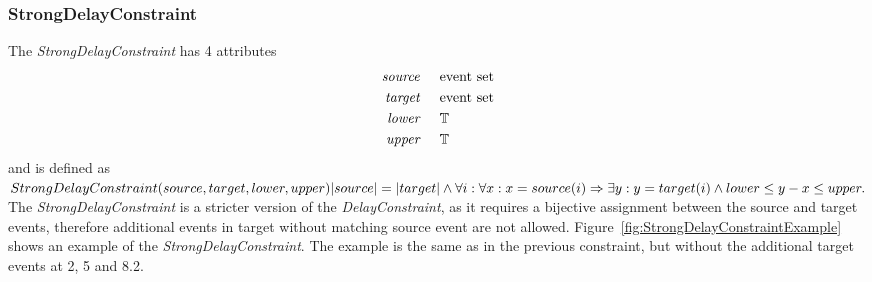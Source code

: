 	\subsubsection{StrongDelayConstraint}
		The \emph{StrongDelayConstraint} has 4 attributes
		\begin{align*}
			\emph{source} & \hspace{.5cm}\text{event set}\\
			\emph{target} & \hspace{.5cm}\text{event set}\\
			\emph{lower}  & \hspace{.5cm}\text{$\mathbb{T}$}\\
			\emph{upper}  & \hspace{.5cm}\text{$\mathbb{T}$}
		\end{align*}
		and is defined as\\[10pt]
		\begin{math}
			StrongDelayConstraint( source, target, lower, upper )\\
			|source| = |target| \land\\
			\forall i: \forall x: x=source(i) \Rightarrow \exists y: y=target(i)\land lower\leq y-x\leq upper.
		\end{math}\\[10pt]
		The \emph{StrongDelayConstraint} is a stricter version of the \emph{DelayConstraint}, as it requires a bijective assignment between the source and target events, therefore additional events in target without matching source event are not allowed. Figure~\ref{fig:StrongDelayConstraintExample} shows an example of the \emph{StrongDelayConstraint}. The example is the same as in the previous constraint, but without the additional target events at 2, 5 and 8.2.
